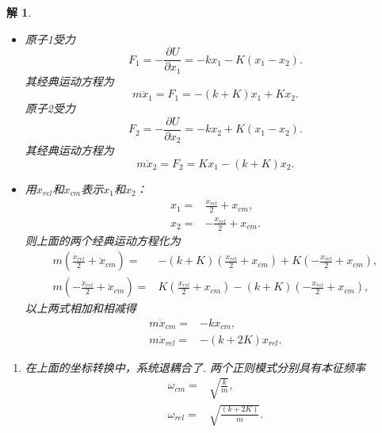 \documentclass[UTF8,10pt,a4paper]{article}
\theoremstyle{Problem}
\theoremstyle{Solution}
\newtheorem*{sol}{解}
\begin{document}
\begin{sol}
    \begin{itemize}
        \item[$\triangleright$] 原子1受力
        \begin{equation}
            F_1=-\frac{\partial U}{\partial x_1}=-kx_1-K(x_1-x_2).
        \end{equation}
        其经典运动方程为
        \begin{equation}
            m\ddot{x}_1=F_1=-(k+K)x_1+Kx_2.
        \end{equation}
        原子2受力
        \begin{equation}
            F_2=-\frac{\partial U}{\partial x_2}=-kx_2+K(x_1-x_2).
        \end{equation}
        其经典运动方程为
        \begin{equation}
            m\ddot{x}_2=F_2=Kx_1-(k+K)x_2.
        \end{equation}
        \item[$\triangleright$] 用$x_{rel}$和$x_{cm}$表示$x_1$和$x_2$：
        \begin{align}
            x_1=&\frac{x_{rel}}{2}+x_{cm},\\
            x_2=&-\frac{x_{rel}}{2}+x_{cm}.
        \end{align}
        则上面的两个经典运动方程化为
        \begin{align}
            m\left(\frac{\ddot{x}_{rel}}{2}+\ddot{x}_{cm}\right)=&-(k+K)\left(\frac{x_{rel}}{2}+x_{cm}\right)+K\left(-\frac{x_{rel}}{2}+x_{cm}\right),\\
            m\left(-\frac{\ddot{x}_{rel}}{2}+\ddot{x}_{cm}\right)=&K\left(\frac{x_{rel}}{2}+x_{cm}\right)-(k+K)\left(-\frac{x_{rel}}{2}+x_{cm}\right),
        \end{align}
        以上两式相加和相减得
        \begin{align}
            m\ddot{x}_{cm}=&-kx_{cm},\\
            m\ddot{x}_{rel}=&-(k+2K)x_{rel}.
        \end{align}
    \end{itemize}
    \begin{enumerate}
        \item[(a)] 在上面的坐标转换中，系统退耦合了. 两个正则模式分别具有本征频率
        \begin{align}
            \omega_{cm}=&\sqrt{\frac{k}{m}},\\
            \omega_{rel}=&\sqrt{\frac{(k+2K)}{m}}.
        \end{align}

\end{enumerate}
\end{sol}
\end{document}
